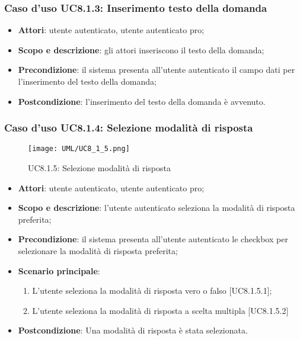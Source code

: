 	\subsubsection{Caso d'uso UC8.1.3: Inserimento testo della domanda}
	\begin{itemize}
		\item
			\textbf{Attori}: utente autenticato, utente autenticato pro;
		\item
			\textbf{Scopo e descrizione}: gli attori inseriscono il testo della domanda;
		\item		
			\textbf{Precondizione}: il sistema presenta all'utente autenticato il campo dati per l'inserimento del testo della domanda;
		\item
			\textbf{Postcondizione}: l'inserimento del testo della domanda è avvenuto.
	\end{itemize}
	\subsubsection{Caso d'uso UC8.1.4: Selezione modalità di risposta}
	\label{UC8.1.5}
	\begin{figure}[h]
		\centering
			\texttt{[image: UML/UC8\_1\_5.png]}
		\caption{UC8.1.5: Selezione modalità di risposta}
	\end{figure}
	\FloatBarrier
	\begin{itemize}
		\item
			\textbf{Attori}: utente autenticato, utente autenticato pro;
		\item
			\textbf{Scopo e descrizione}: l'utente autenticato seleziona la modalità di risposta preferita;
		\item		
			\textbf{Precondizione}: il sistema presenta all'utente autenticato le checkbox per selezionare la modalità di risposta preferita;
		\item
			\textbf{Scenario principale}:
	       		\begin{enumerate}
					\item
					L'utente seleziona la modalità di risposta vero o falso [UC8.1.5.1];
					\item
					L'utente seleziona la modalità di risposta a scelta multipla [UC8.1.5.2]	       		
	       		\end{enumerate}
		\item
			\textbf{Postcondizione}: Una modalità di risposta è stata selezionata.
	\end{itemize}
